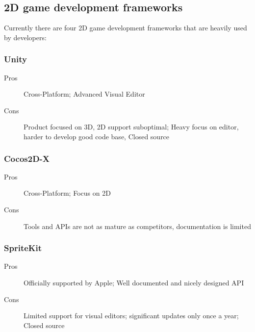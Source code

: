 \subsection{2D game development frameworks}
Currently there are four 2D game development frameworks that are heavily used by
developers:

\subsubsection{Unity}

\begin{description}
\item[Pros] Cross-Platform; Advanced Visual Editor
\item[Cons] Product focused on 3D, 2D support suboptimal; Heavy focus on editor,
harder to develop good code base, Closed source
\end{description}

\subsubsection{Cocos2D-X}

\begin{description}
\item[Pros] Cross-Platform; Focus on 2D
\item[Cons] Tools and APIs are not as mature as competitors, documentation is
limited
\end{description}

\subsubsection{SpriteKit}

\begin{description}
\item[Pros] Officially supported by Apple; Well documented
and nicely designed API
\item[Cons] Limited support for visual editors;
significant updates only once a year; Closed source
\end{description}

